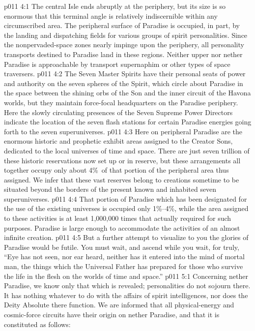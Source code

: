 \vs p011 4:1 The central Isle ends abruptly at the periphery, but its size is so enormous that this terminal angle is relatively indiscernible within any circumscribed area. The peripheral surface of Paradise is occupied, in part, by the landing and dispatching fields for various groups of spirit personalities. Since the nonpervaded\hyp{}space zones nearly impinge upon the periphery, all personality transports destined to Paradise land in these regions. Neither upper nor nether Paradise is approachable by transport supernaphim or other types of space traversers.
\vs p011 4:2 The Seven Master Spirits have their personal seats of power and authority on the seven spheres of the Spirit, which circle about Paradise in the space between the shining orbs of the Son and the inner circuit of the Havona worlds, but they maintain force\hyp{}focal headquarters on the Paradise periphery. Here the slowly circulating presences of the Seven Supreme Power Directors indicate the location of the seven flash stations for certain Paradise energies going forth to the seven superuniverses.
\vs p011 4:3 Here on peripheral Paradise are the enormous historic and prophetic exhibit areas assigned to the Creator Sons, dedicated to the local universes of time and space. There are just seven trillion of these historic reservations now set up or in reserve, but these arrangements all together occupy only about 4\%\ of that portion of the peripheral area thus assigned. We infer that these vast reserves belong to creations sometime to be situated beyond the borders of the present known and inhabited seven superuniverses.
\vs p011 4:4 That portion of Paradise which has been designated for the use of the existing universes is occupied only 1\%--4\%, while the area assigned to these activities is at least 1,000,000 times that actually required for such purposes. Paradise is large enough to accommodate the activities of an almost infinite creation.
\vs p011 4:5 But a further attempt to visualize to you the glories of Paradise would be futile. You must wait, and ascend while you wait, for truly, “Eye has not seen, nor ear heard, neither has it entered into the mind of mortal man, the things which the Universal Father has prepared for those who survive the life in the flesh on the worlds of time and space.”
\vs p011 5:1 Concerning nether Paradise, we know only that which is revealed; personalities do not sojourn there. It has nothing whatever to do with the affairs of spirit intelligences, nor does the Deity Absolute there function. We are informed that all physical\hyp{}energy and cosmic\hyp{}force circuits have their origin on nether Paradise, and that it is constituted as follows:
